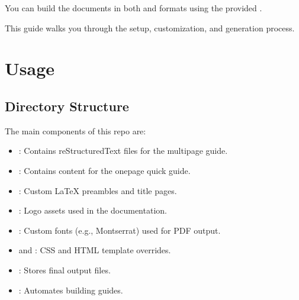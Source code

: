 \documentclass[letterpaper,11pt,oneside,english,openany,oneside]{sphinxmanual}
\begin{document}
\sphinxAtStartPar
You can build the documents in both  and  formats using the provided .

\sphinxAtStartPar
This guide walks you through the setup, customization, and generation process.

\sphinxstepscope


\chapter{Usage}
\label{\detokenize{z02_usage:usage}}\label{\detokenize{z02_usage::doc}}

\section{Directory Structure}
\label{\detokenize{z02_usage:directory-structure}}
\sphinxAtStartPar
The main components of this repo are:
\begin{itemize}
\item {} 
\sphinxAtStartPar
{}: Contains reStructuredText files for the multi\sphinxhyphen{}page guide.

\item {} 
\sphinxAtStartPar
{}: Contains content for the one\sphinxhyphen{}page quick guide.

\item {} 
\sphinxAtStartPar
{}: Custom LaTeX preambles and title pages.

\item {} 
\sphinxAtStartPar
{}: Logo assets used in the documentation.

\item {} 
\sphinxAtStartPar
{}: Custom fonts (e.g., Montserrat) used for PDF output.

\item {} 
\sphinxAtStartPar
{} and : CSS and HTML template overrides.

\item {} 
\sphinxAtStartPar
{}: Stores final output files.

\item {} 
\sphinxAtStartPar
{}: Automates building guides.

\end{itemize}
\end{document}
